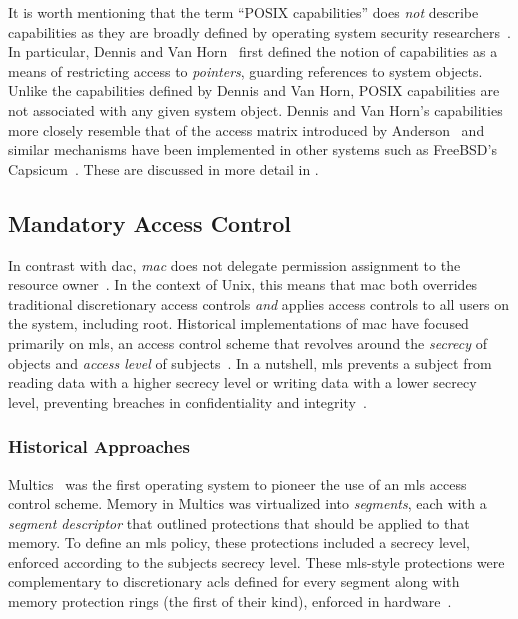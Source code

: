 It is worth mentioning that the term \enquote{POSIX capabilities} does \textit{not}
describe capabilities as they are broadly defined by operating system security
researchers~\cite{anderson2017_comparison}. In particular, Dennis and Van
Horn~\cite{dennis1966_semantics} first defined the notion of capabilities as a means of
restricting access to \textit{pointers}, guarding references to system objects. Unlike the
capabilities defined by Dennis and Van Horn, POSIX capabilities are not associated with
any given system object. Dennis and Van Horn's capabilities more closely resemble that of
the access matrix introduced by Anderson~\cite{anderson1972_report} and similar mechanisms
have been implemented in other systems such as FreeBSD's
Capsicum~\cite{watson2010_capsicum}. These are discussed in more detail in
.

\subsection{Mandatory Access Control}%
\label{ss:mac}

In contrast with \gls{dac}, \textit{\gls{mac}} does not delegate permission assignment to
the resource owner~\cite{spencer1999_flask, van_oorschot2020_tools_jewels,
jaeger2008_os_security}. In the context of Unix, this means that \gls{mac} both overrides
traditional discretionary access controls \textit{and} applies access controls to all
users on the system, including root. Historical implementations of \gls{mac} have focused
primarily on \gls{mls}, an access control scheme that revolves around the \textit{secrecy}
of objects and \textit{access level} of subjects~\cite{bell2005_blp}. In a nutshell,
\gls{mls} prevents a subject from reading data with a higher secrecy level or writing data
with a lower secrecy level, preventing breaches in confidentiality and
integrity~\cite{jaeger2008_os_security}.

\subsubsection*{Historical Approaches}

Multics~\cite{vyssotsky1965_multics, corbato1965_multics} was the first operating system
to pioneer the use of an \gls{mls} access control scheme. Memory in Multics was
virtualized into \textit{segments}, each with a \textit{segment descriptor} that outlined
protections that should be applied to that memory. To define an \gls{mls} policy, these
protections included a secrecy level, enforced according to the subjects secrecy level.
These \gls{mls}-style protections were complementary to discretionary \gls{acl}s defined
for every segment along with memory protection rings (the first of their kind), enforced
in hardware~\cite{jaeger2008_os_security}.

